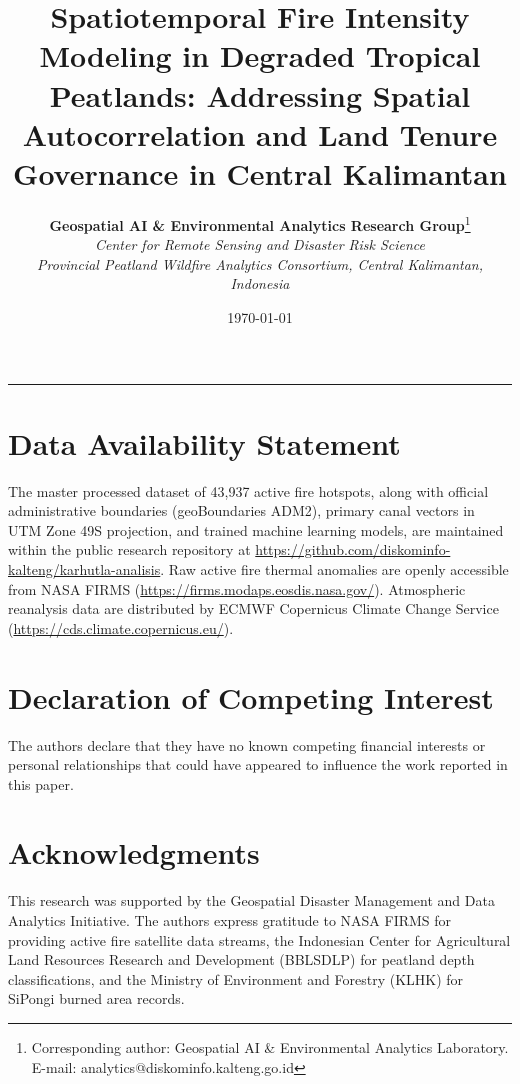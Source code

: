 \documentclass[11pt,a4paper]{article}
\title{\textbf{Spatiotemporal Fire Intensity Modeling in Degraded Tropical Peatlands: Addressing Spatial Autocorrelation and Land Tenure Governance in Central Kalimantan}}
\author{
    \textbf{Geospatial AI \& Environmental Analytics Research Group}\thanks{Corresponding author: Geospatial AI \& Environmental Analytics Laboratory. E-mail: analytics@diskominfo.kalteng.go.id}\\
    \textit{Center for Remote Sensing and Disaster Risk Science}\\
    \textit{Provincial Peatland Wildfire Analytics Consortium, Central Kalimantan, Indonesia}
}
\date{\today}
\begin{document}
\maketitle



\vspace{1.5em}
\hrule
\vspace{1.5em}











\section*{Data Availability Statement}
The master processed dataset of 43,937 active fire hotspots, along with official administrative boundaries (geoBoundaries ADM2), primary canal vectors in UTM Zone 49S projection, and trained machine learning models, are maintained within the public research repository at \url{https://github.com/diskominfo-kalteng/karhutla-analisis}. Raw active fire thermal anomalies are openly accessible from NASA FIRMS (\url{https://firms.modaps.eosdis.nasa.gov/}). Atmospheric reanalysis data are distributed by ECMWF Copernicus Climate Change Service (\url{https://cds.climate.copernicus.eu/}).

\section*{Declaration of Competing Interest}
The authors declare that they have no known competing financial interests or personal relationships that could have appeared to influence the work reported in this paper.

\section*{Acknowledgments}
This research was supported by the Geospatial Disaster Management and Data Analytics Initiative. The authors express gratitude to NASA FIRMS for providing active fire satellite data streams, the Indonesian Center for Agricultural Land Resources Research and Development (BBLSDLP) for peatland depth classifications, and the Ministry of Environment and Forestry (KLHK) for SiPongi burned area records.



\end{document}
